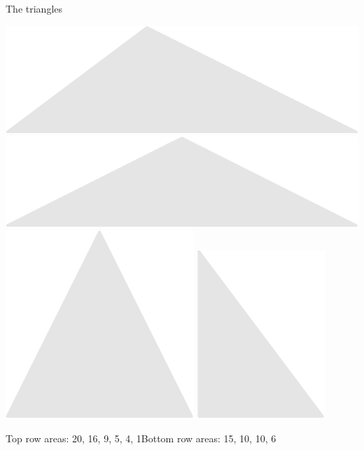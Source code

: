 \documentclass[14pt]{beamer}
\begin{document}
\begin{frame}{The triangles}
\begin{center}
            \includegraphics[scale=0.3]{figures/figure024g.pdf}\quad
            \includegraphics[scale=0.3]{figures/figure024h.pdf}\quad
            \includegraphics[scale=0.3]{figures/figure024i.pdf}\quad
            \includegraphics[scale=0.3]{figures/figure024j.pdf}\\

            \bigskip

            {\footnotesize Top row areas: 20, 16, 9, 5, 4, 1\qquad Bottom row areas: 15, 10, 10, 6}
        \end{center}
    \end{frame}
\end{document}
